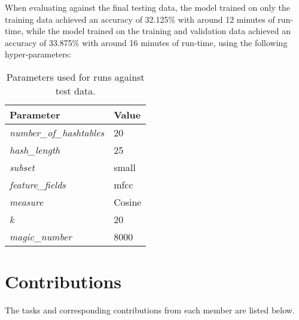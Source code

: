 \documentclass[11pt]{article}
\begin{document}
When evaluating against the final testing data, the model trained on only the training data achieved an accuracy of 32.125\% with around 12 minutes of run-time, while the model trained on the training and validation data achieved an accuracy of 33.875\% with around 16 minutes of run-time, using the following hyper-parameters:

\begin{table*}[h]
\begin{center}

\begin{tabular}{|l|l|}
\hline
\textbf{Parameter}              &         \textbf{Value}                  \\ \hline
\textit{number\_of\_hashtables} & 20                         \\ \hline
\textit{hash\_length}           & 25                                                              \\ \hline
\textit{subset}        & small                   \\ \hline
\textit{feature\_fields}        & mfcc                 \\ \hline
\textit{measure}                & Cosine \\ \hline
\textit{k}                      & 20                                                 \\ \hline
\textit{magic\_number} &    8000 \\ \hline
\end{tabular}%

\caption{Parameters used for runs against test data.}
\end{center}
\end{table*}

\section*{Contributions}

The tasks and corresponding contributions from each member are listed below.
\end{document}
